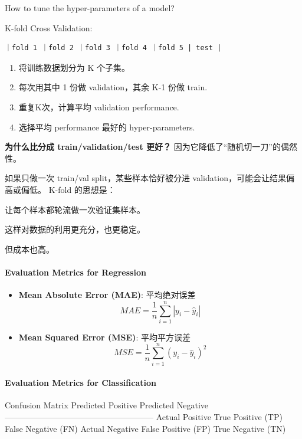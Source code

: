 \documentclass[
]{ctexart}
\providecommand{\tightlist}{%
  \setlength{\itemsep}{0pt}\setlength{\parskip}{0pt}}
\begin{document}
How to tune the hyper-parameters of a model?

K-fold Cross Validation:

\begin{verbatim}
｜fold 1 ｜fold 2 ｜fold 3 ｜fold 4 ｜fold 5 | test |
\end{verbatim}

\begin{enumerate}
\def\labelenumi{\arabic{enumi}.}
\tightlist
\item
  将训练数据划分为 K 个子集。
\item
  每次用其中 1 份做 validation，其余 K-1 份做 train.
\item
  重复K次，计算平均 validation performance.
\item
  选择平均 performance 最好的 hyper-parameters.
\end{enumerate}

\textbf{为什么比分成 train/validation/test 更好？}
因为它降低了``随机切一刀''的偶然性。

如果只做一次 train/val split，某些样本恰好被分进
validation，可能会让结果偏高或偏低。 K-fold 的思想是：

让每个样本都轮流做一次验证集样本。

这样对数据的利用更充分，也更稳定。

但成本也高。

\paragraph{Evaluation Metrics for
Regression}\label{evaluation-metrics-for-regression}

\begin{itemize}
\tightlist
\item
  \textbf{Mean Absolute Error (MAE)}: 平均绝对误差
  \[MAE = \frac{1}{n} \sum_{i=1}^{n} |y_i - \hat{y}_i|\]
\item
  \textbf{Mean Squared Error (MSE)}: 平均平方误差
  \[MSE = \frac{1}{n} \sum_{i=1}^{n} (y_i - \hat{y}_i)^2\]
\end{itemize}

\paragraph{Evaluation Metrics for
Classification}\label{evaluation-metrics-for-classification}

Confusion Matrix \textbar{} \textbar{} Predicted Positive \textbar{}
Predicted Negative \textbar{}
\textbar---------------\textbar--------------------\textbar--------------------\textbar{}
\textbar{} Actual Positive \textbar{} True Positive (TP) \textbar{}
False Negative (FN) \textbar{} \textbar{} Actual Negative \textbar{}
False Positive (FP) \textbar{} True Negative (TN) \textbar{}
\end{document}
